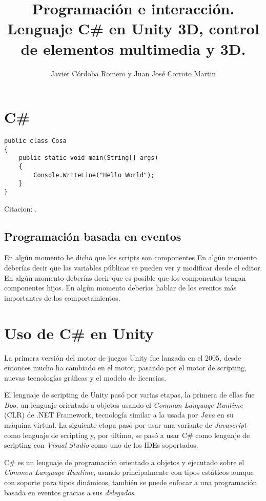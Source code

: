 \documentclass{pre-tfg}
\title{Programación e interacción. Lenguaje C\# en Unity 3D, control de elementos multimedia y 3D.}
\author{Javier Córdoba Romero y Juan José Corroto Martin}
\begin{document}
\maketitle
\tableofcontents

\newpage
\section{C\#}

\begin{lstlisting}[caption=Hello world]
public class Cosa
{
	public static void main(String[] args)
	{
		Console.WriteLine("Hello World");
	}
}
\end{lstlisting}

Citacion: \cite{Bow93}.

\subsection{Programación basada en eventos}

En algún momento he dicho que los scripts son componentes
En algún momento deberías decir que las variables públicas se pueden ver y modificar desde el editor.
En algún momento deberías decir que es posible que los componentes tengan componentes hijos.
En algún momento deberías hablar de los eventos más importantes de los comportamientos.




\section{Uso de C\# en Unity}

La primera versión del motor de juegos Unity fue lanzada en el 2005, desde entonces mucho ha cambiado en el motor, pasando por el motor de scripting, nuevas tecnologías gráficas y el modelo de licencias.

El lenguaje de scripting de Unity pasó por varias etapas, la primera de ellas fue \emph{Boo}, un lenguaje orientado a objetos usando el \emph{Common Language Runtime} (CLR) de .NET Framework, tecnología similar a la usada por \emph{Java} en su máquina virtual. La siguiente etapa pasó por usar una variante de \emph{Javascript} como lenguaje de scripting y, por último, se pasó a usar C\# como lenguaje de scripting con \emph{Visual Studio} como uno de los IDEs soportados.

C\# es un lenguaje de programación orientado a objetos y ejecutado sobre el \emph{Common Language Runtime}, usando principalmente con tipos estáticos aunque con soporte para tipos dinámicos, también se puede enfocar a una programación basada en eventos gracias a sus \emph{delegados}.
\end{document}
